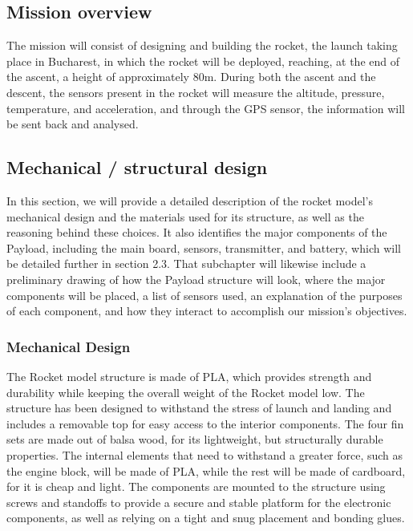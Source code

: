 \subsection{Mission overview}

The mission will consist of designing and building the rocket, the launch taking place in Bucharest, in which the rocket will be deployed, reaching, at the end of the ascent, a height of approximately 80m. During both the ascent and the descent, the sensors present in the rocket will measure the altitude, pressure, temperature, and acceleration, and through the GPS sensor, the information will be sent back and analysed.

\subsection{Mechanical / structural design}

In this section, we will provide a detailed description of the rocket model's mechanical design and the materials used for its structure, as well as the reasoning behind these choices. It also identifies the major components of the Payload, including the main board, sensors, transmitter, and battery, which will be detailed further in section 2.3. That subchapter will likewise include a preliminary drawing of how the Payload structure will look, where the major components will be placed, a list of sensors used, an explanation of the purposes of each component, and how they interact to accomplish our mission's objectives.

\subsubsection{Mechanical Design}

The Rocket model structure is made of PLA, which provides strength and durability while keeping the overall weight of the Rocket model low. The structure has been designed to withstand the stress of launch and landing and includes a removable top for easy access to the interior components. The four fin sets are made out of balsa wood, for its lightweight, but structurally durable properties. The internal elements that need to withstand a greater force, such as the engine block, will be made of PLA, while the rest will be made of cardboard, for it is cheap and light. The components are mounted to the structure using screws and standoffs to provide a secure and stable platform for the electronic components, as well as relying on a tight and snug placement and bonding glues.

